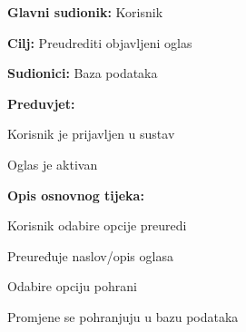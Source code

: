 					\noindent {}
					\begin{packed_item}
	
						\item \textbf{Glavni sudionik: } Korisnik
						\item  \textbf{Cilj:} Preudrediti objavljeni oglas
						\item  \textbf{Sudionici:} Baza podataka
						\item  \textbf{Preduvjet:} 
						    \begin{packed_enum}
	
							\item Korisnik je prijavljen u sustav
							\item Oglas je aktivan
						    \end{packed_enum}
						\item  \textbf{Opis osnovnog tijeka:}
						
						\item[] \begin{packed_enum}
	
							\item Korisnik odabire opcije preuredi
							\item Preuređuje naslov/opis oglasa
							\item Odabire opciju pohrani
							\item Promjene se pohranjuju u bazu podataka
						\end{packed_enum}
						
					
					\end{packed_item}
					
